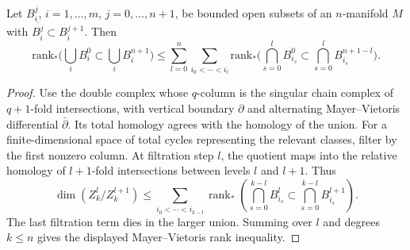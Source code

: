 \begin{lemma}
  \label{lem:pet-ch12-mayer-vietoris-rank}

  Let $B_i^j$, $i=1,\dots,m$, $j=0,\dots,n+1$, be bounded open subsets of an
  $n$-manifold $M$ with $\overline{B_i^j}\subset B_i^{j+1}$. Then
  \[
    \mathrm{rank}_*\Big(\bigcup_iB_i^0\subset\bigcup_iB_i^{n+1}\Big)
    \le\sum_{l=0}^{n}\sum_{i_0<\cdots<i_l}
    \mathrm{rank}_*\Big(\bigcap_{s=0}^lB_{i_s}^0\subset\bigcap_{s=0}^lB_{i_s}^{n+1-l}\Big).
  \]
\end{lemma}
\begin{proof}
  \sketch
  Use the double complex whose \(q\)-column is the singular chain complex
  of \(q+1\)-fold intersections, with vertical boundary \(\partial\) and
  alternating Mayer--Vietoris differential \(\bar\partial\). Its total
  homology agrees with the homology of the union. For a finite-dimensional
  space of total cycles representing the relevant classes, filter by the first
  nonzero column. At filtration step \(l\), the quotient maps into the
  relative homology of \(l+1\)-fold intersections between levels \(l\) and
  \(l+1\). Thus
  \[\dim(Z_k^l/Z_k^{l+1})\le\sum_{i_0<\cdots<i_{k-l}}
  \operatorname{rank}_*\left(\bigcap_{s=0}^{k-l} B_{i_s}^{l}\subset
    \bigcap_{s=0}^{k-l} B_{i_s}^{l+1}\right).\]
  The last filtration term dies in the larger union. Summing over \(l\) and
  degrees \(k\le n\) gives the displayed Mayer--Vietoris rank inequality.
\end{proof}

